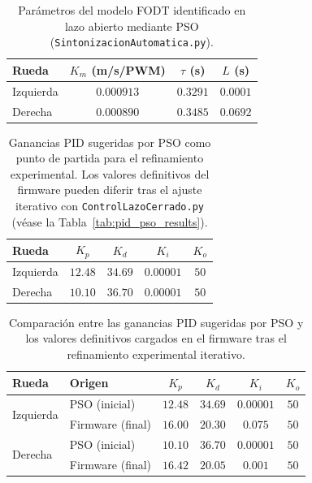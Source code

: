 
\begin{table}[H]
\centering
\caption{Par\'{a}metros del modelo FODT identificado en lazo abierto mediante PSO (\texttt{SintonizacionAutomatica.py}).}
\label{tab:fodt_auto}
\begin{tabular}{lccc}
\hline
\textbf{Rueda} & $K_m$ \textbf{(m/s/PWM)} & $\tau$ \textbf{(s)} & $L$ \textbf{(s)} \\
\hline
Izquierda & $0.000913$ & $0.3291$ & $0.0001$ \\
Derecha & $0.000890$ & $0.3485$ & $0.0692$ \\
\hline
\end{tabular}
\end{table}

\begin{table}[H]
\centering
\caption{Ganancias PID sugeridas por PSO como punto de partida para el refinamiento experimental. Los valores definitivos del firmware pueden diferir tras el ajuste iterativo con \texttt{ControlLazoCerrado.py} (v\'{e}ase la Tabla~\ref{tab:pid_pso_results}).}
\label{tab:pid_auto_inicial}
\begin{tabular}{lcccc}
\hline
\textbf{Rueda} & $K_p$ & $K_d$ & $K_i$ & $K_o$ \\
\hline
Izquierda & $12.48$ & $34.69$ & $0.00001$ & $50$ \\
Derecha & $10.10$ & $36.70$ & $0.00001$ & $50$ \\
\hline
\end{tabular}
\end{table}

\begin{table}[H]
\centering
\caption{Comparaci\'{o}n entre las ganancias PID sugeridas por PSO y los valores definitivos cargados en el firmware tras el refinamiento experimental iterativo.}
\label{tab:auto_vs_firmware}
\begin{tabular}{llcccc}
\hline
\textbf{Rueda} & \textbf{Origen} & $K_p$ & $K_d$ & $K_i$ & $K_o$ \\
\hline
\multirow{2}{*}{Izquierda} & PSO (inicial) & $12.48$ & $34.69$ & $0.00001$ & $50$ \\
 & Firmware (final) & $16.00$ & $20.30$ & $0.075$ & $50$ \\
\hline
\multirow{2}{*}{Derecha} & PSO (inicial) & $10.10$ & $36.70$ & $0.00001$ & $50$ \\
 & Firmware (final) & $16.42$ & $20.05$ & $0.001$ & $50$ \\
\hline
\end{tabular}
\end{table}
